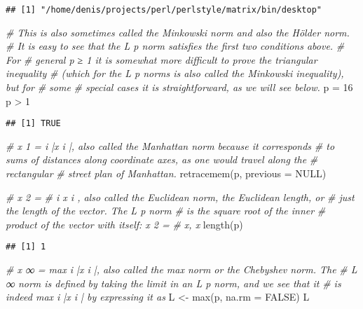 \documentclass[
]{article}
\newenvironment{Shaded}{\begin{snugshade}}{\end{snugshade}}
\newcommand{\AttributeTok}[1]{\textcolor[rgb]{0.77,0.63,0.00}{#1}}
\newcommand{\CommentTok}[1]{\textcolor[rgb]{0.56,0.35,0.01}{\textit{#1}}}
\newcommand{\ConstantTok}[1]{\textcolor[rgb]{0.00,0.00,0.00}{#1}}
\newcommand{\DecValTok}[1]{\textcolor[rgb]{0.00,0.00,0.81}{#1}}
\newcommand{\FunctionTok}[1]{\textcolor[rgb]{0.00,0.00,0.00}{#1}}
\newcommand{\NormalTok}[1]{#1}
\newcommand{\OtherTok}[1]{\textcolor[rgb]{0.56,0.35,0.01}{#1}}
\newcommand{\SpecialCharTok}[1]{\textcolor[rgb]{0.00,0.00,0.00}{#1}}
\begin{document}
\begin{verbatim}
## [1] "/home/denis/projects/perl/perlstyle/matrix/bin/desktop"
\end{verbatim}

\begin{Shaded}
\begin{Highlighting}[]
\CommentTok{\# This is also sometimes called the Minkowski norm and also the Hölder norm.}
\CommentTok{\# It is easy to see that the L p norm satisﬁes the ﬁrst two conditions above. }
\CommentTok{\# For}
\CommentTok{\# general p ≥ 1 it is somewhat more diﬃcult to prove the triangular inequality}
\CommentTok{\# (which for the L p norms is also called the Minkowski inequality), but for }
\CommentTok{\# some}
\CommentTok{\# special cases it is straightforward, as we will see below.}
\NormalTok{p }\OtherTok{=} \DecValTok{16}
\NormalTok{p }\SpecialCharTok{\textgreater{}} \DecValTok{1}
\end{Highlighting}
\end{Shaded}

\begin{verbatim}
## [1] TRUE
\end{verbatim}

\begin{Shaded}
\begin{Highlighting}[]
\CommentTok{\# x 1 = i |x i |, also called the Manhattan norm because it corresponds}
\CommentTok{\# to sums of distances along coordinate axes, as one would travel along the}
\CommentTok{\# rectangular}
\CommentTok{\# street plan of Manhattan.}
\FunctionTok{retracemem}\NormalTok{(p, }\AttributeTok{previous =} \ConstantTok{NULL}\NormalTok{)}

\CommentTok{\# x 2 =}
\CommentTok{\# i x i , also called the Euclidean norm, the Euclidean length, or}
\CommentTok{\# just the length of the vector. The L p norm}
\CommentTok{\#  is the square root of the inner}
\CommentTok{\# product of the vector with itself: x 2 =}
\CommentTok{\#  x, x}
\FunctionTok{length}\NormalTok{(p)}
\end{Highlighting}
\end{Shaded}

\begin{verbatim}
## [1] 1
\end{verbatim}

\begin{Shaded}
\begin{Highlighting}[]
\CommentTok{\# x ∞ = max i |x i |, also called the max norm or the Chebyshev norm. The}
\CommentTok{\# L ∞ norm is deﬁned by taking the limit in an L p norm, and we see that it}
\CommentTok{\# is indeed max i |x i | by expressing it as}
\NormalTok{L }\OtherTok{\textless{}{-}} \FunctionTok{max}\NormalTok{(p, }\AttributeTok{na.rm =} \ConstantTok{FALSE}\NormalTok{)}
\NormalTok{L}
\end{Highlighting}
\end{Shaded}
\end{document}
